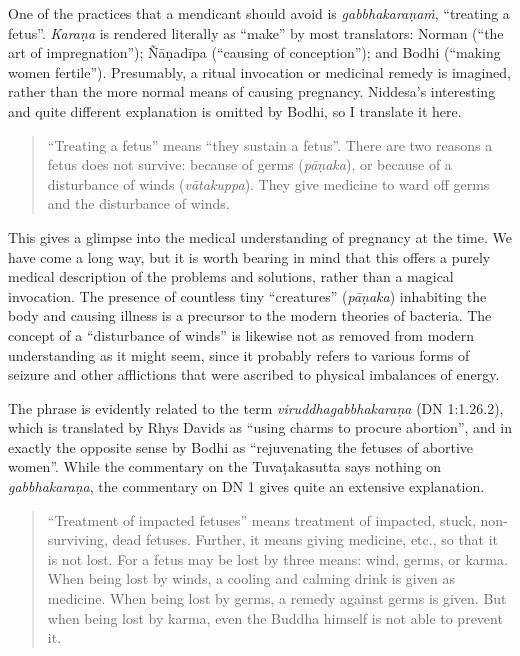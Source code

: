 \documentclass[12pt,openany]{book}%
\begin{document}
One of the practices that a mendicant should avoid is \textit{\textsanskrit{gabbhakaraṇaṁ}}, “treating a fetus”. \textit{\textsanskrit{Karaṇa}} is rendered literally as “make” by most translators: Norman (“the art of impregnation”); \textsanskrit{Ñāṇadīpa} (“causing of conception”); and Bodhi (“making women fertile”). Presumably, a ritual invocation or medicinal remedy is imagined, rather than the more normal means of causing pregnancy. Niddesa’s interesting and quite different explanation is omitted by Bodhi, so I translate it here.

\begin{quotation}%
“Treating a fetus” means “they sustain a fetus”. There are two reasons a fetus does not survive: because of germs (\textit{\textsanskrit{pāṇaka}}), or because of a disturbance of winds (\textit{\textsanskrit{vātakuppa}}). They give medicine to ward off germs and the disturbance of winds.

%
\end{quotation}

This gives a glimpse into the medical understanding of pregnancy at the time. We have come a long way, but it is worth bearing in mind that this offers a purely medical description of the problems and solutions, rather than a magical invocation. The presence of countless tiny “creatures” (\textit{\textsanskrit{pāṇaka}}) inhabiting the body and causing illness is a precursor to the modern theories of bacteria. The concept of a “disturbance of winds” is likewise not as removed from modern understanding as it might seem, since it probably refers to various forms of seizure and other afflictions that were ascribed to physical imbalances of energy.

The phrase is evidently related to the term \textit{\textsanskrit{viruddhagabbhakaraṇa}} (DN 1:1.26.2), which is translated by Rhys Davids as “using charms to procure abortion”, and in exactly the opposite sense by Bodhi as “rejuvenating the fetuses of abortive women”. While the commentary on the \textsanskrit{Tuvaṭakasutta} says nothing on \textit{\textsanskrit{gabbhakaraṇa}}, the commentary on DN 1 gives quite an extensive explanation.

\begin{quotation}%
“Treatment of impacted fetuses” means treatment of impacted, stuck, non-surviving, dead fetuses. Further, it means giving medicine, etc., so that it is not lost. For a fetus may be lost by three means: wind, germs, or karma. When being lost by winds, a cooling and calming drink is given as medicine. When being lost by germs, a remedy against germs is given. But when being lost by karma, even the Buddha himself is not able to prevent it.

%
\end{quotation}
\end{document}
